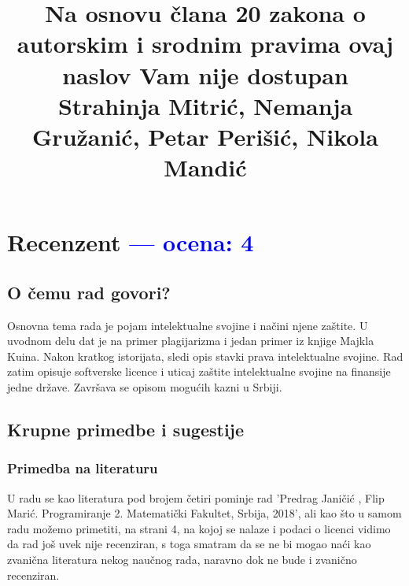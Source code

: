 \documentclass[a4paper]{report}
\newcommand{\odgovor}[1]{\textcolor{blue}{#1}}
\begin{document}
\title{Na osnovu člana 20 zakona o autorskim i srodnim pravima ovaj naslov Vam nije dostupan
\\ \small{Strahinja Mitrić, Nemanja Gružanić, Petar Perišić, Nikola Mandić}}

\maketitle

\tableofcontents

\chapter{Recenzent \odgovor{--- ocena: 4} }

\section{O čemu rad govori?}

Osnovna tema rada je pojam intelektualne svojine i načini njene zaštite. U uvodnom delu dat je na primer plagijarizma i jedan primer iz knjige Majkla Kuina. Nakon kratkog istorijata, sledi opis stavki prava intelektualne svojine. Rad zatim opisuje softverske licence i uticaj zaštite intelektualne svojine na finansije jedne države. Završava se opisom mogućih kazni u Srbiji.

\section{Krupne primedbe i sugestije}
\label{sec:Krupne stvari}

\subsection{Primedba na literaturu}
\label{primedba:Literatura}
U radu se kao literatura pod brojem četiri pominje rad 'Predrag Janičić , Flip Marić. Programiranje 2. Matematički Fakultet, Srbija, 2018',
ali kao što u samom radu možemo primetiti, na strani 4, na kojoj se nalaze i podaci o licenci vidimo da rad još uvek nije recenziran,
s toga smatram da se ne bi mogao naći kao zvanična literatura nekog naučnog rada, naravno dok ne bude i zvanično recenziran.
\end{document}
